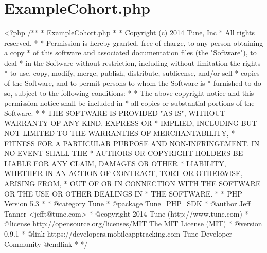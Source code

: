 \hypertarget{ExampleCohort_8php-example}{\section{Example\-Cohort.\-php}
}

\begin{DoxyCodeInclude}
<?php\textcolor{comment}{}
\textcolor{comment}{/**}
\textcolor{comment}{ * ExampleCohort.php}
\textcolor{comment}{ * }
\textcolor{comment}{ * Copyright (c) 2014 Tune, Inc}
\textcolor{comment}{ * All rights reserved.}
\textcolor{comment}{ *}
\textcolor{comment}{ * Permission is hereby granted, free of charge, to any person obtaining a copy}
\textcolor{comment}{ * of this software and associated documentation files (the "Software"), to deal}
\textcolor{comment}{ * in the Software without restriction, including without limitation the rights}
\textcolor{comment}{ * to use, copy, modify, merge, publish, distribute, sublicense, and/or sell}
\textcolor{comment}{ * copies of the Software, and to permit persons to whom the Software is}
\textcolor{comment}{ * furnished to do so, subject to the following conditions:}
\textcolor{comment}{ *}
\textcolor{comment}{ * The above copyright notice and this permission notice shall be included in}
\textcolor{comment}{ * all copies or substantial portions of the Software.}
\textcolor{comment}{ *}
\textcolor{comment}{ * THE SOFTWARE IS PROVIDED "AS IS", WITHOUT WARRANTY OF ANY KIND, EXPRESS OR}
\textcolor{comment}{ * IMPLIED, INCLUDING BUT NOT LIMITED TO THE WARRANTIES OF MERCHANTABILITY,}
\textcolor{comment}{ * FITNESS FOR A PARTICULAR PURPOSE AND NON-INFRINGEMENT. IN NO EVENT SHALL THE}
\textcolor{comment}{ * AUTHORS OR COPYRIGHT HOLDERS BE LIABLE FOR ANY CLAIM, DAMAGES OR OTHER}
\textcolor{comment}{ * LIABILITY, WHETHER IN AN ACTION OF CONTRACT, TORT OR OTHERWISE, ARISING FROM,}
\textcolor{comment}{ * OUT OF OR IN CONNECTION WITH THE SOFTWARE OR THE USE OR OTHER DEALINGS IN}
\textcolor{comment}{ * THE SOFTWARE.}
\textcolor{comment}{ *}
\textcolor{comment}{ * PHP Version 5.3}
\textcolor{comment}{ *}
\textcolor{comment}{ * @category  Tune}
\textcolor{comment}{ * @package   Tune\_PHP\_SDK}
\textcolor{comment}{ * @author    Jeff Tanner <jefft@tune.com>}
\textcolor{comment}{ * @copyright 2014 Tune (http://www.tune.com)}
\textcolor{comment}{ * @license   http://opensource.org/licenses/MIT The MIT License (MIT)}
\textcolor{comment}{ * @version   0.9.1}
\textcolor{comment}{ * @link      https://developers.mobileapptracking.com Tune Developer Community @endlink}
\textcolor{comment}{ *}
\textcolor{comment}{ */}


\end{DoxyCodeInclude}
